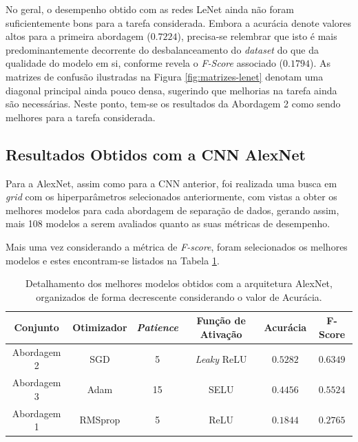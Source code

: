 No geral, o desempenho obtido com as redes LeNet ainda não foram suficientemente bons para a tarefa considerada. Embora a acurácia denote valores altos para a primeira abordagem ($0.7224$), precisa-se relembrar que isto é mais predominantemente decorrente do desbalanceamento do \emph{dataset} do que da qualidade do modelo em si, conforme revela o \emph{F-Score} associado ($0.1794$). As matrizes de confusão ilustradas na Figura \ref{fig:matrizes-lenet} denotam uma diagonal principal ainda pouco densa, sugerindo que melhorias na tarefa ainda são necessárias. Neste ponto, tem-se os resultados da Abordagem 2 como sendo melhores para a tarefa considerada.



\subsection{Resultados Obtidos com a CNN AlexNet}
\label{sec:alexnet}

 Para a AlexNet, assim como para a CNN anterior, foi realizada uma busca em \emph{grid} com os hiperparâmetros selecionados anteriormente, com vistas a obter os melhores modelos para cada abordagem de separação de dados, gerando assim, mais 108 modelos a serem avaliados quanto as suas métricas de desempenho.

 Mais uma vez considerando a métrica de \emph{F-score}, foram selecionados os melhores modelos e estes encontram-se listados na Tabela \ref{tab:alexnet}.

 \begin{table}[h!]
 \centering
 \caption{Detalhamento dos melhores modelos obtidos com a arquitetura AlexNet, organizados de forma decrescente considerando o valor de Acurácia.}
 \label{tab:alexnet}
 \begin{tabular}{cccccc}
 \toprule
 \textbf{Conjunto} & \textbf{Otimizador} & \textbf{\emph{Patience}}  & \textbf{Função de Ativação} & \textbf{Acurácia} & \textbf{F-Score} \\
 \midrule
 Abordagem 2 & SGD & 5 & \emph{Leaky} ReLU & $0.5282$ & $0.6349$ \\
 Abordagem 3 & Adam & 15 & SELU & $0.4456$ & $0.5524$ \\
 Abordagem 1 & RMSprop & 5 & ReLU & $0.1844$ & $0.2765$ \\
 \bottomrule
 \end{tabular}
\end{table}


